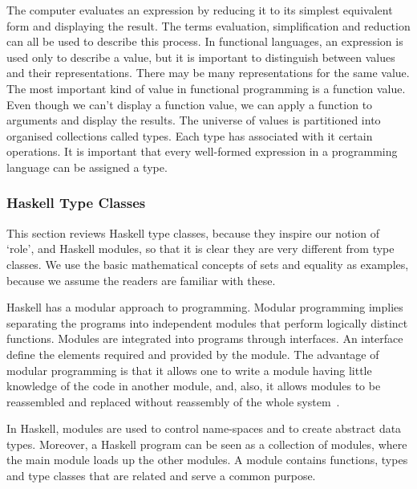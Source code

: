 \documentclass[a4paper,12pt,oneside,fleqn]{book} %
\begin{document}
The computer evaluates an expression by reducing it to its simplest
equivalent form and displaying the result. The terms evaluation,
simplification and reduction can all be used to describe this
process. In functional languages, an expression is used only to describe a
value, but it is important to distinguish between values and their
representations. There may be many representations for the same value. The
most important kind of value in functional programming is a function value.
Even though we can't display a function value, we can apply a function to
arguments and display the results. The universe of values is partitioned
into organised collections called types. Each type has associated with it
certain operations. It is important that every well-formed expression in a
programming language can be assigned a type.~\cite{bird1988introduction}

\subsubsection{Haskell Type Classes} %

This section reviews Haskell type classes, because they inspire our notion
of `role', and Haskell modules, so that it is clear they are very different
from type classes. We use the basic mathematical concepts of sets and
equality as examples, because we assume the readers are familiar with these.


Haskell has a modular approach to programming. Modular programming implies
separating the programs into independent modules that perform logically
distinct functions. Modules are integrated into programs through
interfaces. An interface define the elements required and provided by the
module. The advantage of modular programming is that it allows one to write
a module having little knowledge of the code in another module, and, also,
it allows modules to be reassembled and replaced without reassembly of the
whole system~\cite{DBLP:journals/cacm/Parnas72a}.

In Haskell, modules are used to control name-spaces and to create abstract
data types. Moreover, a Haskell program can be seen as a collection of
modules, where the main module loads up the other modules. A module
contains functions, types and type classes that are related and serve a
common purpose.
\end{document}
